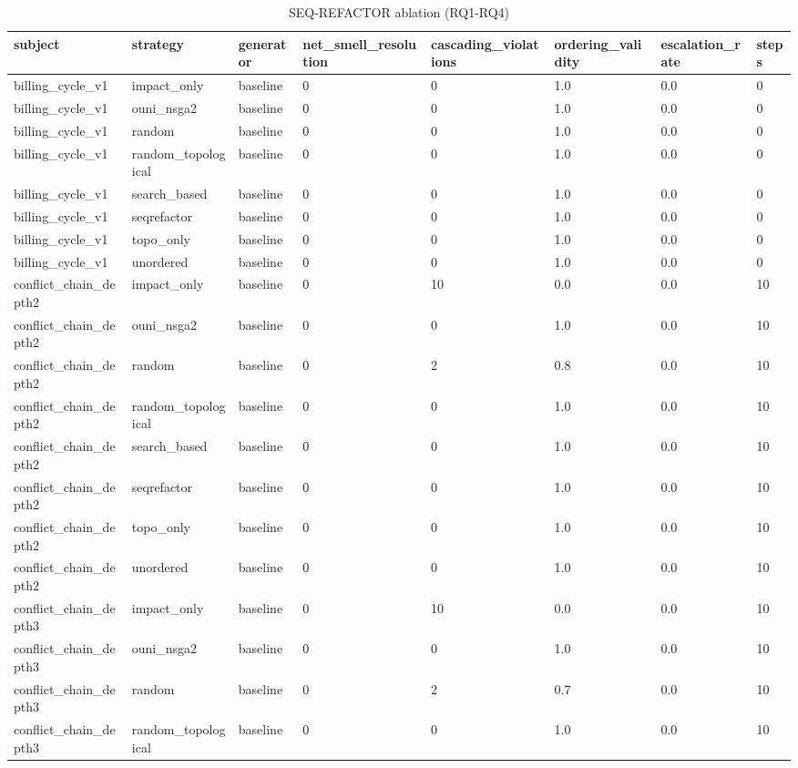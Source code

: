 \begin{table}[t]
\centering
\caption{SEQ-REFACTOR ablation (RQ1-RQ4)}
\label{tab:ablation}
\begin{tabular}{llllllll}
\toprule
subject & strategy & generator & net\_smell\_resolution & cascading\_violations & ordering\_validity & escalation\_rate & steps \\
\midrule
billing\_cycle\_v1 & impact\_only & baseline & 0 & 0 & 1.0 & 0.0 & 0 \\
billing\_cycle\_v1 & ouni\_nsga2 & baseline & 0 & 0 & 1.0 & 0.0 & 0 \\
billing\_cycle\_v1 & random & baseline & 0 & 0 & 1.0 & 0.0 & 0 \\
billing\_cycle\_v1 & random\_topological & baseline & 0 & 0 & 1.0 & 0.0 & 0 \\
billing\_cycle\_v1 & search\_based & baseline & 0 & 0 & 1.0 & 0.0 & 0 \\
billing\_cycle\_v1 & seqrefactor & baseline & 0 & 0 & 1.0 & 0.0 & 0 \\
billing\_cycle\_v1 & topo\_only & baseline & 0 & 0 & 1.0 & 0.0 & 0 \\
billing\_cycle\_v1 & unordered & baseline & 0 & 0 & 1.0 & 0.0 & 0 \\
conflict\_chain\_depth2 & impact\_only & baseline & 0 & 10 & 0.0 & 0.0 & 10 \\
conflict\_chain\_depth2 & ouni\_nsga2 & baseline & 0 & 0 & 1.0 & 0.0 & 10 \\
conflict\_chain\_depth2 & random & baseline & 0 & 2 & 0.8 & 0.0 & 10 \\
conflict\_chain\_depth2 & random\_topological & baseline & 0 & 0 & 1.0 & 0.0 & 10 \\
conflict\_chain\_depth2 & search\_based & baseline & 0 & 0 & 1.0 & 0.0 & 10 \\
conflict\_chain\_depth2 & seqrefactor & baseline & 0 & 0 & 1.0 & 0.0 & 10 \\
conflict\_chain\_depth2 & topo\_only & baseline & 0 & 0 & 1.0 & 0.0 & 10 \\
conflict\_chain\_depth2 & unordered & baseline & 0 & 0 & 1.0 & 0.0 & 10 \\
conflict\_chain\_depth3 & impact\_only & baseline & 0 & 10 & 0.0 & 0.0 & 10 \\
conflict\_chain\_depth3 & ouni\_nsga2 & baseline & 0 & 0 & 1.0 & 0.0 & 10 \\
conflict\_chain\_depth3 & random & baseline & 0 & 2 & 0.7 & 0.0 & 10 \\
conflict\_chain\_depth3 & random\_topological & baseline & 0 & 0 & 1.0 & 0.0 & 10 \\

\end{tabular}
\end{table}
